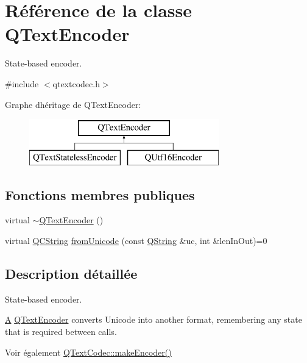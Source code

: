 \hypertarget{class_q_text_encoder}{}\section{Référence de la classe Q\+Text\+Encoder}
\label{class_q_text_encoder}


State-\/based encoder.  




{\ttfamily \#include $<$qtextcodec.\+h$>$}

Graphe d\textquotesingle{}héritage de Q\+Text\+Encoder\+:\begin{figure}[H]
\begin{center}
\leavevmode
\includegraphics[height=2.000000cm]{class_q_text_encoder}
\end{center}
\end{figure}
\subsection*{Fonctions membres publiques}
\begin{DoxyCompactItemize}
\item 
virtual \hyperlink{class_q_text_encoder_ad4aeae820b76fb14a7f5d411ba424b7a}{$\sim$\+Q\+Text\+Encoder} ()
\item 
virtual \hyperlink{class_q_c_string}{Q\+C\+String} \hyperlink{class_q_text_encoder_a3b199427ee9b7f862fe65811165dbbfa}{from\+Unicode} (const \hyperlink{class_q_string}{Q\+String} \&uc, int \&len\+In\+Out)=0
\end{DoxyCompactItemize}


\subsection{Description détaillée}
State-\/based encoder. 

\hyperlink{class_a}{A} \hyperlink{class_q_text_encoder}{Q\+Text\+Encoder} converts Unicode into another format, remembering any state that is required between calls.

\begin{DoxySeeAlso}{Voir également}
\hyperlink{class_q_text_codec_a27628237031589bbaf95d3f4b4e7d7db}{Q\+Text\+Codec\+::make\+Encoder()} 
\end{DoxySeeAlso}


